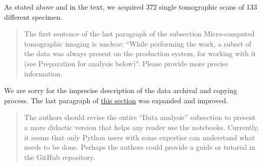 \documentclass[color,english,personal]{ubletter}
\begin{document}
\begin{letter}{}
As stated above and in the text, we acquired 372 single tomographic
scans of 133 different specimen.

\begin{quote}
The first sentence of the last paragraph of the subsection
Micro-computed tomographic imaging is unclear: ``While performing the
work, a subset of the data was always present on the production system,
for working with it (see Preparation for analysis below)''. Please
provide more precise information.
\end{quote}

We are sorry for the imprecise description of the data archival and
copying process. The last paragraph of
\href{https://habi.github.io/EAWAG-manuscript/\#micro-computed-tomographic-imaging}{this
section} was expanded and improved.

\begin{quote}
The authors should revise the entire ``Data analysis'' subsection to
present a more didactic version that helps any reader use the notebooks.
Currently, it seems that only Python users with some expertise can
understand what needs to be done. Perhaps the authors could provide a
guide or tutorial in the GitHub repository.
\end{quote}


\end{letter}
\end{document}
